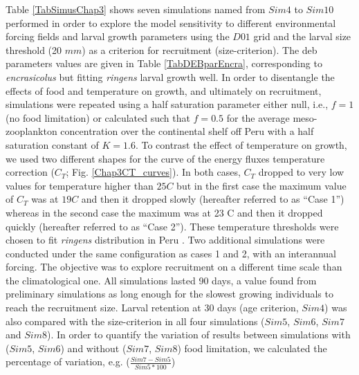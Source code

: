 Table \ref{TabSimusChap3} shows seven simulations named from $Sim4$ to $Sim10$ performed in order
to explore the model sensitivity to different environmental forcing fields and larval growth
parameters using the $D01$ grid and the larval size threshold (20 $mm$) as a criterion for
recruitment (size-criterion). The \acrshort{deb} parameters values are given in Table \ref{TabDEBparEncra}, corresponding to \textit{\gls{encrasicolus}} \citep{PethRoos2013} but fitting \textit{\gls{ringens}} larval growth well. In order to disentangle the effects of food and temperature on growth, and ultimately on recruitment, simulations were repeated using a half saturation parameter either null, i.e., $f = 1$ (no food limitation) or calculated such that $f = 0.5$ for the average meso-zooplankton concentration over the continental shelf off Peru with a half saturation constant of $K = 1.6$. To contrast the effect of temperature on growth, we used two different shapes for the curve of the energy fluxes temperature correction ($C_{T}$; Fig. \ref{Chap3CT_curves}). In both cases, $C_{T}$ dropped to very low values for temperature higher than $25$\textdegree $C$ but in the first case the maximum value of $C_{T}$ was at $19$\textdegree $C$ and then it dropped slowly (hereafter referred to as ``Case 1'') whereas in the second case the maximum was at 23 \textdegree C and then it dropped quickly (hereafter referred to as ``Case 2''). These temperature thresholds were chosen to fit \textit{\gls{ringens}} distribution in Peru \citep{CastPena2022}. Two additional simulations were conducted under the same configuration as cases 1 and 2, with an interannual forcing. The objective was to explore recruitment on a different time scale than the climatological one. All simulations lasted 90 days, a value found from preliminary simulations as long enough for the slowest growing individuals to reach the recruitment size. Larval retention at 30 days (age criterion, $Sim 4$) was also compared with the size-criterion in all four simulations ($Sim 5$, $Sim 6$, $Sim 7$ and $Sim 8$). In order to quantify the variation of results between simulations with ($Sim 5$, $Sim 6$) and without ($Sim 7$, $Sim 8$) food limitation, we calculated the percentage of variation, e.g. ($\frac{Sim 7-Sim 5}{Sim 5*100}$)

